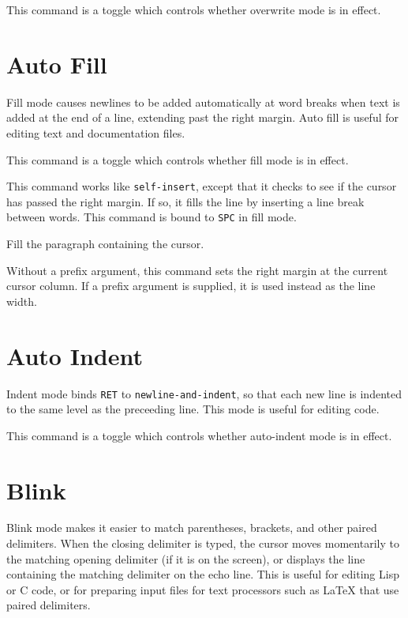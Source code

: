 \fbody This command is a toggle which controls whether overwrite mode is
in effect.

\section{Auto Fill}

Fill mode causes newlines to be added automatically at word
breaks when text is added at the end of a line, extending past the
right margin.  Auto fill is useful for editing text and documentation
files.

\fbody This command is a toggle which controls whether fill mode is
in effect.

\fbody This command works like {\tt self-insert}, except that it checks
to see if the cursor has passed the right margin.  If so, it fills
the line by inserting a line break between words.  This command is bound to 
{\tt SPC} in fill mode.

\fbody Fill the paragraph containing the cursor.

\fbody Without a prefix argument, this command sets the right margin
at the current cursor column.  If a prefix argument is supplied, it is used
instead as the line width.

\section{Auto Indent}

Indent mode binds {\tt RET} to {\tt newline-and-indent}, so
that each new line is indented to the same level as the preceeding
line.  This mode is useful for editing code. 

\fbody This command is a toggle which controls whether auto-indent mode
is in effect.

\section{Blink}

Blink mode makes it easier to match parentheses, brackets, and other
paired delimiters.  When the closing delimiter is typed, the cursor
moves momentarily to the matching opening delimiter (if it is on the
screen), or displays the line containing the matching delimiter on the
echo line.  This is useful for editing Lisp or C code, or for
preparing input files for text processors such as LaTeX that use
paired delimiters. 

